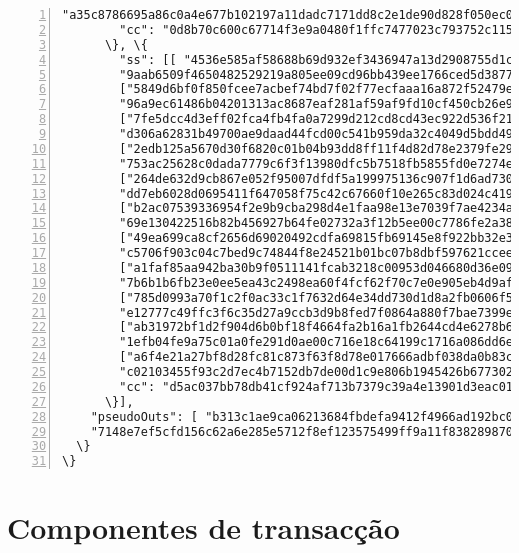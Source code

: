 \begin{appendices}
\begin{Verbatim}[commandchars=\\\{\}, numbers=left]
        "a35c8786695a86c0a4e677b102197a11dadc7171dd8c2e1de90d828f050ec00f"]], 
        "cc": "0d8b70c600c67714f3e9a0480f1ffc7477023c793752c1152d5df0813f75ff0f"
      \}, \{
        "ss": [[ "4536e585af58688b69d932ef3436947a13d2908755d1c644ca9d6a978f0f0206",
        "9aab6509f4650482529219a805ee09cd96bb439ee1766ced5d3877bf1518370b"],
        ["5849d6bf0f850fcee7acbef74bd7f02f77ecfaaa16a872f52479ebd27339760f",
        "96a9ec61486b04201313ac8687eaf281af59af9fd10cf450cb26e9dc8f1ce804"],
        ["7fe5dcc4d3eff02fca4fb4fa0a7299d212cd8cd43ec922d536f21f92c8f93f00",
        "d306a62831b49700ae9daad44fcd00c541b959da32c4049d5bdd49be28d96701"],
        ["2edb125a5670d30f6820c01b04b93dd8ff11f4d82d78e2379fe29d7a68d9c103",
        "753ac25628c0dada7779c6f3f13980dfc5b7518fb5855fd0e7274e3075a3410c"],
        ["264de632d9cb867e052f95007dfdf5a199975136c907f1d6ad73061938f49c01",
        "dd7eb6028d0695411f647058f75c42c67660f10e265c83d024c4199bed073d01"],
        ["b2ac07539336954f2e9b9cba298d4e1faa98e13e7039f7ae4234ac801641340f",
        "69e130422516b82b456927b64fe02732a3f12b5ee00c7786fe2a381325bf3004"],
        ["49ea699ca8cf2656d69020492cdfa69815fb69145e8f922bb32e358c23cebb0f",
        "c5706f903c04c7bed9c74844f8e24521b01bc07b8dbf597621cceeeb3afc1d0c"],
        ["a1faf85aa942ba30b9f0511141fcab3218c00953d046680d36e09c35c04be905",
        "7b6b1b6fb23e0ee5ea43c2498ea60f4fcf62f70c7e0e905eb4d9afa1d0a18800"],
        ["785d0993a70f1c2f0ac33c1f7632d64e34dd730d1d8a2fb0606f5770ed633506",
        "e12777c49ffc3f6c35d27a9ccb3d9b8fed7f0864a880f7bae7399e334207280e"],
        ["ab31972bf1d2f904d6b0bf18f4664fa2b16a1fb2644cd4e6278b63ade87b6d09",
        "1efb04fe9a75c01a0fe291d0ae00c716e18c64199c1716a086dd6e32f63e0a07"],
        ["a6f4e21a27bf8d28fc81c873f63f8d78e017666adbf038da0b83c2ad04ef6805",
        "c02103455f93c2d7ec4b7152db7de00d1c9e806b1945426b6773026b4a85dd03"]], 
        "cc": "d5ac037bb78db41cf924af713b7379c39a4e13901d3eac017238550a1a3b910a"
      \}],
    "pseudoOuts": [ "b313c1ae9ca06213684fbdefa9412f4966ad192bc0b2f74ed1731381adb7ab58",
    "7148e7ef5cfd156c62a6e285e5712f8ef123575499ff9a11f838289870522423"]
  \}
\}
\end{Verbatim}



\section*{Componentes de transacção}
	

\end{appendices}

